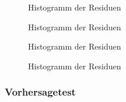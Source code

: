 \documentclass[
  10pt,
  letterpaper,
  a4paper, twoside]{scrreprt}
\begin{document}
\begin{figure}[H]


\caption{\label{fig-Verteilungschecks-1}Histogramm der Residuen}

\end{figure}%

\begin{figure}[H]


\caption{\label{fig-Verteilungschecks-2}Histogramm der Residuen}

\end{figure}%

\begin{figure}[H]


\caption{\label{fig-Verteilungschecks-3}Histogramm der Residuen}

\end{figure}%

\begin{figure}[H]


\caption{\label{fig-Verteilungschecks-4}Histogramm der Residuen}

\end{figure}%

\subsubsection{Vorhersagetest}\label{vorhersagetest}
\end{document}
